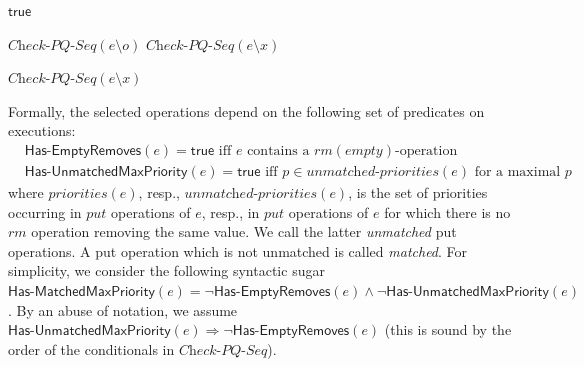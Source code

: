 \begin{algorithm}[t]
\footnotesize{

{\Return $\mathsf{true}$\;}

{
    {
        \KwRet $\textit{Check-PQ-Seq}(e \setminus o)$\;
    }
}
{
    {
        \KwRet $\textit{Check-PQ-Seq}(e \setminus x)$\;
    }
}

\Else
{
    {
        \KwRet $\textit{Check-PQ-Seq}(e \setminus x)$\;
    }
}}
\caption{$\textit{Check-PQ-Seq}$}
\label{alg:seq_check}
\end{algorithm}


Formally, the selected operations depend on the following set of predicates on executions:
\begin{align*}
& \mathsf{Has\text{-}EmptyRemoves}(e)=\mathsf{true} \mbox{ iff  $e$ contains a $\textit{rm}(\textit{empty})$-operation} \hspace{1cm}\\
& \mathsf{Has\text{-}UnmatchedMaxPriority}(e)=\mathsf{true} \mbox{ iff $p\in \textit{unmatched-priorities}(e)$ for a maximal $p$}
\end{align*}
where $\textit{priorities}(e)$, resp., $\textit{unmatched-priorities}(e)$, is the set of priorities occurring in $\textit{put}$ operations of $e$, resp., in $\textit{put}$ operations of $e$ for which there is no $\textit{rm}$ operation removing the same value. We call the latter \emph{unmatched} put operations. A put operation which is not unmatched is called \emph{matched}. For simplicity, we consider the following syntactic sugar $\mathsf{Has\text{-}MatchedMaxPriority}(e)=\neg \mathsf{Has\text{-}EmptyRemoves}(e)\land \neg \mathsf{Has\text{-}UnmatchedMaxPriority}(e)$. By an abuse of notation, we assume  $\mathsf{Has\text{-}UnmatchedMaxPriority}(e) \Rightarrow \neg \mathsf{Has\text{-}EmptyRemoves}(e)$ (this is sound by the order of the conditionals in $\textit{Check-PQ-Seq}$).

